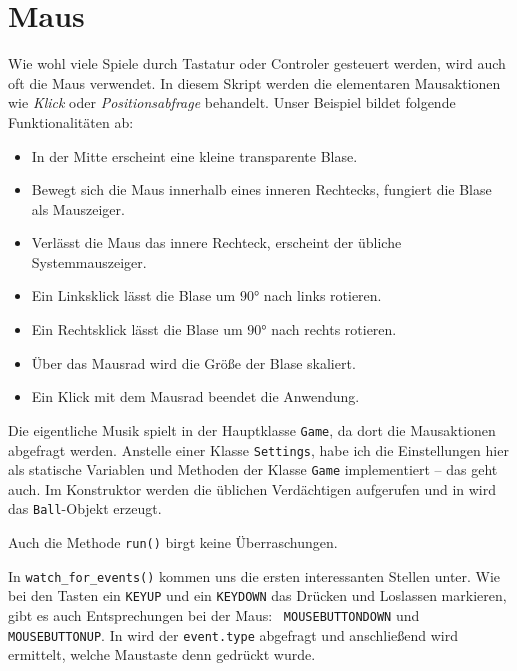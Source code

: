 \newpage
\section{Maus}

Wie wohl viele Spiele durch Tastatur oder Controler gesteuert werden, wird auch oft die Maus verwendet. In diesem Skript werden die elementaren Mausaktionen wie \emph{Klick} oder \emph{Positionsabfrage} behandelt. Unser Beispiel bildet folgende Funktionalitäten ab:
\begin{itemize}
	\item In der Mitte erscheint eine kleine transparente Blase.
	\item Bewegt sich die Maus innerhalb eines inneren Rechtecks, fungiert die Blase als Mauszeiger.
	\item Verlässt die Maus das innere Rechteck, erscheint der übliche Systemmauszeiger.
	\item Ein Linksklick lässt die Blase um $90°$ nach links rotieren.
	\item Ein Rechtsklick lässt die Blase um $90°$ nach rechts rotieren.
	\item Über das Mausrad wird die Größe der Blase skaliert.
	\item Ein Klick mit dem Mausrad beendet die Anwendung.
\end{itemize}


Die eigentliche Musik spielt in der Hauptklasse \texttt{Game}, da dort die Mausaktionen abgefragt werden. Anstelle einer Klasse \texttt{Settings}, habe ich die Einstellungen hier als statische Variablen und Methoden der Klasse \texttt{Game} implementiert -- das geht auch. Im Konstruktor werden die üblichen Verdächtigen aufgerufen und in  wird das \texttt{Ball}-Objekt erzeugt.

\newpage


Auch die Methode \texttt{run()} birgt keine Überraschungen.


In \texttt{watch\_for\_events()} kommen uns die ersten interessanten Stellen unter. Wie bei den Tasten ein \texttt{KEYUP} und ein \texttt{KEYDOWN} das Drücken und Loslassen markieren, gibt es auch Entsprechungen bei der Maus:\  \texttt{MOUSEBUTTONDOWN} und \texttt{MOUSEBUTTONUP}. In  wird der \texttt{event.type} abgefragt und anschließend wird ermittelt, welche Maustaste denn gedrückt wurde. 

